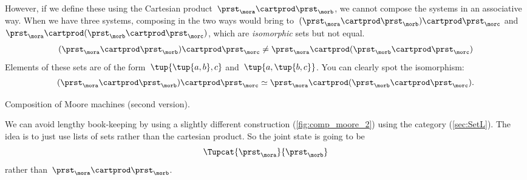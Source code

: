 However, if we define these using the Cartesian product~$\prst_{\mora} \cartprod \prst_{\morb}$, we cannot compose the systems in an associative way.
When we have three systems, composing in the two ways would bring to~$(\prst_{\mora} \cartprod \prst_{\morb}) \cartprod \prst_{\morc}$ and~$\prst_{\mora} \cartprod (\prst_{\morb} \cartprod \prst_{\morc})$, which are \emph{isomorphic} sets but not equal.
%
\begin{equation}
    \label{eq:assoc-fails1}
    (\prst_{\mora} \cartprod \prst_{\morb}) \cartprod \prst_{\morc} \neq \prst_{\mora} \cartprod (\prst_{\morb} \cartprod \prst_{\morc})
\end{equation}
Elements of these sets are of the form~$\tup{\tup{a,b},c}$ and~$\tup{a, \tup{b,c}}$.
%
You can clearly spot the isomorphism:
%
\begin{equation}
    \label{eq:assoc-fails2}
    (\prst_{\mora} \cartprod \prst_{\morb}) \cartprod \prst_{\morc} \simeq \prst_{\mora} \cartprod (\prst_{\morb} \cartprod \prst_{\morc}).
\end{equation}
%

\begin{marginfigure}
    \centering
    \caption{Composition of Moore machines (second version).}
    \label{fig:comp_moore_2}
\end{marginfigure}

We can avoid lengthy book-keeping by using a slightly different construction (\cref{fig:comp_moore_2}) using the \SetL category (\cref{sec:SetL}).
%
The idea is to just use lists of sets rather than the cartesian product.
So the joint state is going to be
\begin{equation}
    \label{eq:moore-comp-good-joint}
    \Tupcat {\prst_{\mora}}   {\prst_{\morb}}
\end{equation}
rather than~$\prst_{\mora} \cartprod \prst_{\morb}$.

